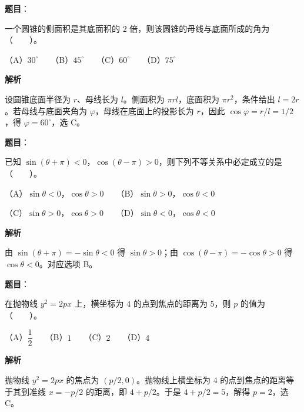 \begin{answer}

\textbf{题目}：

一个圆锥的侧面积是其底面积的 $2$ 倍，则该圆锥的母线与底面所成的角为\mbox{（　　）}。

（A）$30^\circ$　　（B）$45^\circ$　　（C）$60^\circ$　　（D）$75^\circ$

\textbf{解析}

设圆锥底面半径为 $r$、母线长为 $l$。侧面积为 $\pi rl$，底面积为 $\pi r^2$，条件给出 $l=2r$。若母线与底面夹角为 $\varphi$，母线在底面上的投影长为 $r$，因此 $\cos\varphi=r/l=1/2$，得 $\varphi=60^\circ$，选 C。


\end{answer}
\begin{answer}

\textbf{题目}：

已知 $\sin(\theta+\pi)<0$，$\cos(\theta-\pi)>0$，则下列不等关系中必定成立的是\mbox{（　　）}。

（A）$\sin\theta<0$，$\cos\theta>0$　　（B）$\sin\theta>0$，$\cos\theta<0$

（C）$\sin\theta>0$，$\cos\theta>0$　　（D）$\sin\theta<0$，$\cos\theta<0$

\textbf{解析}

由 $\sin(\theta+\pi)=-\sin\theta<0$ 得 $\sin\theta>0$；由 $\cos(\theta-\pi)=-\cos\theta>0$ 得 $\cos\theta<0$。对应选项 B。


\end{answer}
\begin{answer}

\textbf{题目}：

在抛物线 $y^2=2px$ 上，横坐标为 $4$ 的点到焦点的距离为 $5$，则 $p$ 的值为\mbox{（　　）}。

（A）$\dfrac12$　　（B）$1$　　（C）$2$　　（D）$4$

\textbf{解析}

抛物线 $y^2=2px$ 的焦点为 $(p/2,0)$。抛物线上横坐标为 $4$ 的点到焦点的距离等于其到准线 $x=-p/2$ 的距离，即 $4+p/2$。于是 $4+p/2=5$，解得 $p=2$，选 C。


\end{answer}
